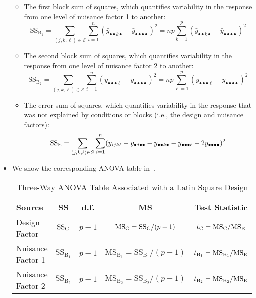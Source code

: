 \begin{itemize}
\begin{itemize}
              \item The first block sum of squares, which quantifies variability in the response from one level of nuisance factor 1 to another:
                    \[ \text{SS}_{\text{B}_1}=\sum_{(j,k,\ell)\in \mathcal{S}}\sum_{i=1}^{n} (\bar{y}_{\bullet\bullet k\bullet}-\bar{y}_{\bullet\bullet\bullet\bullet})^2=np \sum_{k=1}^{p} (\bar{y}_{\bullet\bullet k\bullet}-\bar{y}_{\bullet\bullet\bullet\bullet})^2  \]
              \item The second block sum of squares, which quantifies variability in the response from one level of nuisance factor 2 to another:
                    \[ \text{SS}_{\text{B}_2}=\sum_{(j,k,\ell)\in \mathcal{S}}\sum_{i=1}^{n} (\bar{y}_{\bullet\bullet\bullet\ell}-\bar{y}_{\bullet\bullet\bullet\bullet})^2=np \sum_{\ell=1}^{p} (\bar{y}_{\bullet\bullet\bullet\ell}-\bar{y}_{\bullet\bullet\bullet\bullet})^2  \]
              \item The error sum of squares, which quantifies variability in the response that was not explained by conditions or blocks (i.e., the design and nuisance factors):
                    \[ \text{SS}_{\text{E}}=\sum_{(j,k,\ell)\in \relax{S}}\sum_{i=1}^{n} (y_{ijk\ell}-\bar{y}_{\bullet j\bullet\bullet}-\bar{y}_{\bullet\bullet k\bullet}-\bar{y}_{\bullet\bullet\bullet\ell}-2\bar{y}_{\bullet\bullet\bullet\bullet})^2 \]
          \end{itemize}
    \item We show the corresponding ANOVA table in~.
          \begin{table}[!htbp]
              \centering
              \caption{Three-Way ANOVA Table Associated with a Latin Square Design}\label{three_way_anova_LS}
              \begin{NiceTabular}{|l|c|c|c|c|}
                  \toprule
                  Source    & SS                     & d.f.        & MS                                                                   & Test Statistic                                           \\
                  \midrule
                  Design Factor & $ \text{SS}_{\text{C}} $ & $ p-1 $     & $ \text{MS}_{\text{C}}=\text{SS}_{\text{C}}/(p-1) $     & $ t_\text{C}=\text{MS}_{\text{C}}/\text{MS}_{\text{E}} $ \\
                  Nuisance Factor 1     & $ \text{SS}_{\text{B}_1} $ & $ p-1 $     & $ \text{MS}_{\text{B}_1}=\text{SS}_{\text{B}_1}/(p-1) $     & $ t_{\text{B}_1}=\text{MS}_{\text{B}_1}/\text{MS}_{\text{E}} $ \\
                  Nuisance Factor 2     & $ \text{SS}_{\text{B}_2} $ & $ p-1 $     & $ \text{MS}_{\text{B}_2}=\text{SS}_{\text{B}_2}/(p-1) $     & $ t_{\text{B}_2}=\text{MS}_{\text{B}_2}/\text{MS}_{\text{E}} $ \\

\end{NiceTabular}
\end{table}
\end{itemize}
